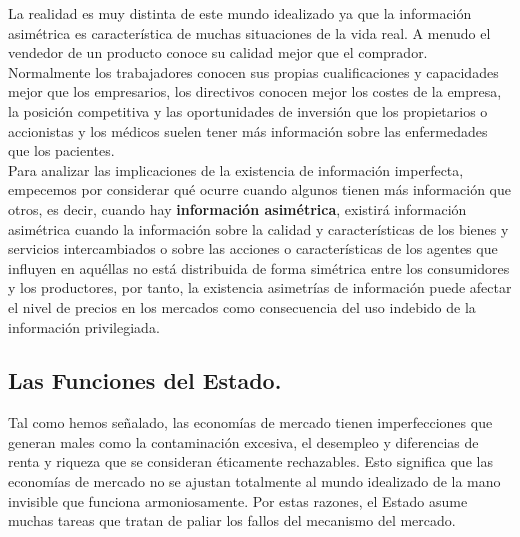 La realidad es muy distinta de este mundo idealizado ya que la información asimétrica es característica de muchas situaciones de la vida real. A menudo el vendedor de un producto conoce su calidad mejor que el comprador. Normalmente los trabajadores conocen sus propias cualificaciones y capacidades mejor que los empresarios, los directivos conocen mejor los costes de la empresa, la posición competitiva y las oportunidades de inversión que los propietarios o accionistas y los médicos suelen tener más información sobre las enfermedades que los pacientes.\\

Para analizar las implicaciones de la existencia de información imperfecta, empecemos por considerar qué ocurre cuando algunos tienen más información que otros, es decir, cuando hay \textbf{información asimétrica}, existirá \textcolor[rgb]{0,0.18,0.39}{información asimétrica cuando la información sobre la calidad y características de los bienes y servicios intercambiados o sobre las acciones o características de los agentes que influyen en aquéllas no está distribuida de forma simétrica entre los consumidores y los productores,} por tanto, la existencia asimetrías de información puede afectar el nivel de precios en los mercados como consecuencia del uso indebido de la información privilegiada.\\

\subsection{{\large Las Funciones del Estado.}}

Tal como hemos señalado, las economías de mercado tienen imperfecciones que generan
males como la contaminación excesiva, el desempleo y diferencias de renta y riqueza que se consideran éticamente rechazables. Esto significa que las economías de mercado no se
ajustan totalmente al mundo idealizado de la mano invisible que funciona armoniosamente. Por estas razones, el Estado asume muchas tareas que tratan de paliar los fallos
del mecanismo del mercado.\\

